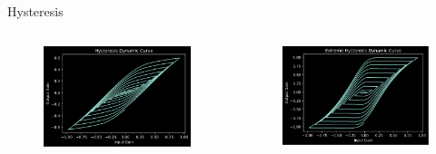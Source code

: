 \begin{frame}{Hysteresis}
    \begin{columns}
        \begin{column}{0.5\linewidth}
            \begin{figure}
                \centering
                \includegraphics[width=2.75in]{../Hysteresis/Pics/Hysteresis_Dynamic}
            \end{figure}
        \end{column}
        \begin{column}{0.5\linewidth}
            \begin{figure}
                \centering
                \includegraphics[width=2.75in]{../Hysteresis/Pics/Extreme_Hysteresis}
            \end{figure}
        \end{column}
    \end{columns}
\end{frame}
